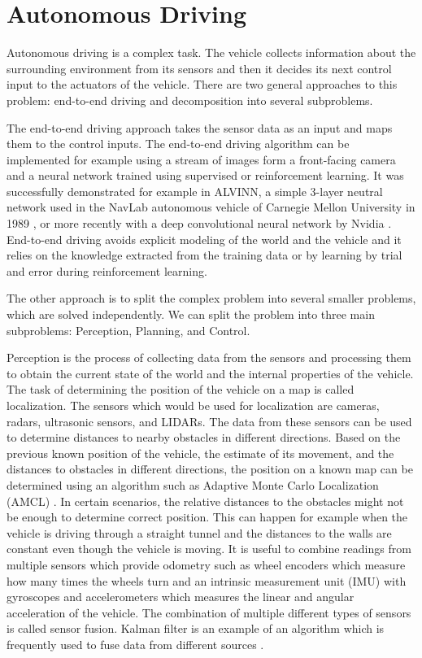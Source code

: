 \chapter{Autonomous Driving}

Autonomous driving is a complex task. The vehicle collects information about the surrounding environment from its sensors and then it decides its next control input to the actuators of the vehicle. There are two general approaches to this problem: end-to-end driving and decomposition into several subproblems.

The end-to-end driving approach takes the sensor data as an input and maps them to the control inputs. The end-to-end driving algorithm can be implemented for example using a stream of images form a front-facing camera and a neural network trained using supervised or reinforcement learning. It was successfully demonstrated for example in ALVINN, a simple 3-layer neutral network used in the NavLab autonomous vehicle of Carnegie Mellon University in 1989 \cite{ALVINN}, or more recently with a deep convolutional neural network by Nvidia \cite{Nvidia}. End-to-end driving avoids explicit modeling of the world and the vehicle and it relies on the knowledge extracted from the training data or by learning by trial and error during reinforcement learning.

The other approach is to split the complex problem into several smaller problems, which are solved independently. We can split the problem into three main subproblems: Perception, Planning, and Control.

Perception is the process of collecting data from the sensors and processing them to obtain the current state of the world and the internal properties of the vehicle. The task of determining the position of the vehicle on a map is called localization. The sensors which would be used for localization are cameras, radars, ultrasonic sensors, and LIDARs. The data from these sensors can be used to determine distances to nearby obstacles in different directions. Based on the previous known position of the vehicle, the estimate of its movement, and the distances to obstacles in different directions, the position on a known map can be determined using an algorithm such as Adaptive Monte Carlo Localization (AMCL) \cite{AMCL_position_estimation} \cite{AMCL_adaptive_sampling}. In certain scenarios, the relative distances to the obstacles might not be enough to determine correct position. This can happen for example when the vehicle is driving through a straight tunnel and the distances to the walls are constant even though the vehicle is moving. It is useful to combine readings from multiple sensors which provide odometry such as wheel encoders which measure how many times the wheels turn and an intrinsic measurement unit (IMU) with gyroscopes and accelerometers which measures the linear and angular acceleration of the vehicle. The combination of multiple different types of sensors is called sensor fusion. Kalman filter is an example of an algorithm which is frequently used to fuse data from different sources \cite{Kalman_filter}.

